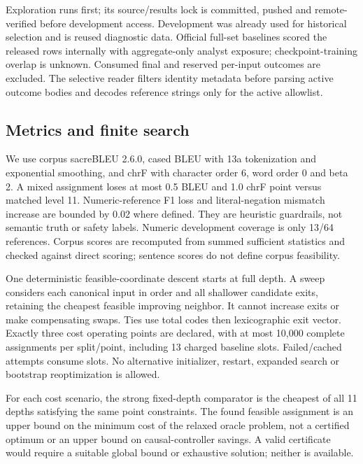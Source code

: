 \documentclass[11pt]{article}
\begin{document}
Exploration runs first; its source/results lock is committed, pushed and remote-verified before development access. Development was already used for historical selection and is reused diagnostic data. Official full-set baselines scored the released rows internally with aggregate-only analyst exposure; checkpoint-training overlap is unknown. Consumed final and reserved per-input outcomes are excluded. The selective reader filters identity metadata before parsing active outcome bodies and decodes reference strings only for the active allowlist.

\subsection{Metrics and finite search}
We use corpus sacreBLEU 2.6.0, cased BLEU with 13a tokenization and exponential smoothing, and chrF with character order 6, word order 0 and beta 2. A mixed assignment loses at most 0.5 BLEU and 1.0 chrF point versus matched level 11. Numeric-reference F1 loss and literal-negation mismatch increase are bounded by 0.02 where defined. They are heuristic guardrails, not semantic truth or safety labels. Numeric development coverage is only 13/64 references. Corpus scores are recomputed from summed sufficient statistics and checked against direct scoring; sentence scores do not define corpus feasibility.

One deterministic feasible-coordinate descent starts at full depth. A sweep considers each canonical input in order and all shallower candidate exits, retaining the cheapest feasible improving neighbor. It cannot increase exits or make compensating swaps. Ties use total codes then lexicographic exit vector. Exactly three cost operating points are declared, with at most 10,000 complete assignments per split/point, including 13 charged baseline slots. Failed/cached attempts consume slots. No alternative initializer, restart, expanded search or bootstrap reoptimization is allowed.

For each cost scenario, the strong fixed-depth comparator is the cheapest of all 11 depths satisfying the same point constraints. The found feasible assignment is an upper bound on the minimum cost of the relaxed oracle problem, not a certified optimum or an upper bound on causal-controller savings. A valid certificate would require a suitable global bound or exhaustive solution; neither is available.
\end{document}
